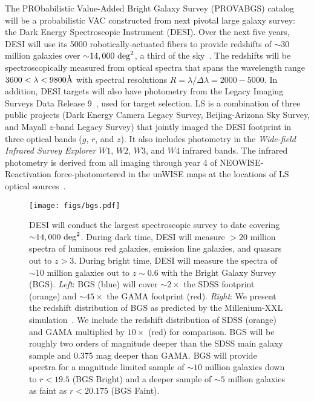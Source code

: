 The PRObabilistic Value-Added Bright Galaxy Survey (PROVABGS) catalog will be a
probabilistic VAC constructed from next pivotal large galaxy survey: the Dark
Energy Spectroscopic Instrument (DESI).
Over the next five years, DESI will use its 5000 robotically-actuated fibers to
provide redshifts of ${\sim}30$ million galaxies over 
${\sim}14,000~{\rm deg}^2$, a third of the sky~\citep{desicollaboration2016,
desicollaboration2016a}.
The redshifts will be spectroscopically measured from optical spectra that
spans the wavelength range $3600 < \lambda < 9800\AA$ with spectral resolutions
$R = \lambda/\Delta \lambda = 2000 - 5000$.
In addition, DESI targets will also have photometry from the Legacy Imaging
Surveys Data Release 9~\citep[LS;][]{dey2019}, used for target selection. 
LS is a combination of three public projects (Dark Energy Camera Legacy Survey,
Beijing-Arizona Sky Survey, and Mayall $z$-band Legacy Survey) that jointly
imaged the DESI footprint in three optical bands ($g$, $r$, and $z$). 
It also includes photometry in the \emph{Wide-field Infrared Survey Explorer}
$W1$, $W2$, $W3$, and $W4$ infrared bands.
The infrared photometry is derived from all imaging through year 4 of
NEOWISE-Reactivation force-photometered in the unWISE maps at the locations of
LS optical sources~\citep{meisner2017a, meisner2017}.

\begin{figure}
\begin{center}
\texttt{[image: figs/bgs.pdf]} 
\caption{
    DESI will conduct the largest spectroscopic survey to date covering
    ${\sim}14,000~{\rm deg}^2$. 
    During dark time, DESI will measure ${>}20$ million spectra of luminous red
    galaxies, emission line galaxies, and quasars out to $z > 3$.
    During bright time, DESI will measure the spectra of ${\sim}10$ million
    galaxies out to $z{\sim}0.6$ with the Bright Galaxy Survey (BGS).
    {\em Left}: BGS (blue) will cover ${\sim}2\times$ the SDSS footprint
    (orange) and ${\sim}45\times$ the GAMA footprint (red).
    {\em Right}: We present the redshift distribution of BGS as predicted by
    the Millenium-XXL simulation~\citep[blue;][]{smith2017}. 
    We include the redshift distribution of SDSS (orange) and GAMA multiplied
    by $10\times$ (red) for comparison. 
    BGS will be roughly two orders of magnitude deeper than the SDSS main
    galaxy sample and 0.375 mag deeper than GAMA.
    BGS will provide spectra for a magnitude limited sample of ${\sim}10$
    million galaxies down to $r < 19.5$ (BGS Bright) and a deeper sample of
    ${\sim 5}$ million galaxies as faint as $r < 20.175$ (BGS Faint).
}
\label{fig:bgs}
\end{center}
\end{figure}

